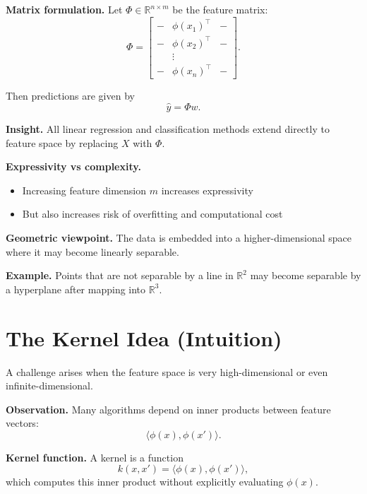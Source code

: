 \medskip

\noindent
\textbf{Matrix formulation.}  
Let $\Phi \in \mathbb{R}^{n \times m}$ be the feature matrix:
\[
\Phi =
\begin{bmatrix}
- & \phi(x_1)^\top & - \\
- & \phi(x_2)^\top & - \\
& \vdots & \\
- & \phi(x_n)^\top & -
\end{bmatrix}.
\]

Then predictions are given by
\[
\hat{y} = \Phi w.
\]

\medskip

\noindent
\textbf{Insight.}  
All linear regression and classification methods extend directly to feature space by replacing $X$ with $\Phi$.

\medskip

\noindent
\textbf{Expressivity vs complexity.}
\begin{itemize}
    \item Increasing feature dimension $m$ increases expressivity
    \item But also increases risk of overfitting and computational cost
\end{itemize}

\medskip

\noindent
\textbf{Geometric viewpoint.}  
The data is embedded into a higher-dimensional space where it may become linearly separable.

\medskip

\noindent
\textbf{Example.}  
Points that are not separable by a line in $\mathbb{R}^2$ may become separable by a hyperplane after mapping into $\mathbb{R}^3$.

\section{The Kernel Idea (Intuition)}

A challenge arises when the feature space is very high-dimensional or even infinite-dimensional.

\medskip

\noindent
\textbf{Observation.}  
Many algorithms depend on inner products between feature vectors:
\[
\langle \phi(x), \phi(x') \rangle.
\]

\medskip

\noindent
\textbf{Kernel function.}  
A kernel is a function
\[
k(x, x') = \langle \phi(x), \phi(x') \rangle,
\]
which computes this inner product without explicitly evaluating $\phi(x)$.

